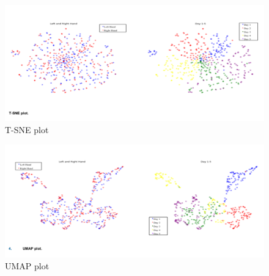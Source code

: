 \documentclass{ieeeaccess}
\begin{document}
\begin{figure}[tb]
    \centering
    \includegraphics[width=1\linewidth]{画像12.png}
    \caption{T-SNE plot}
    \label{fig: T-SNE plot}
\end{figure}

\begin{figure}[tb]
    \centering
    \includegraphics[width=1\linewidth]{画像13.png}
    \caption{UMAP plot}
    \label{fig: UMAP plot}
\end{figure}
\end{document}
